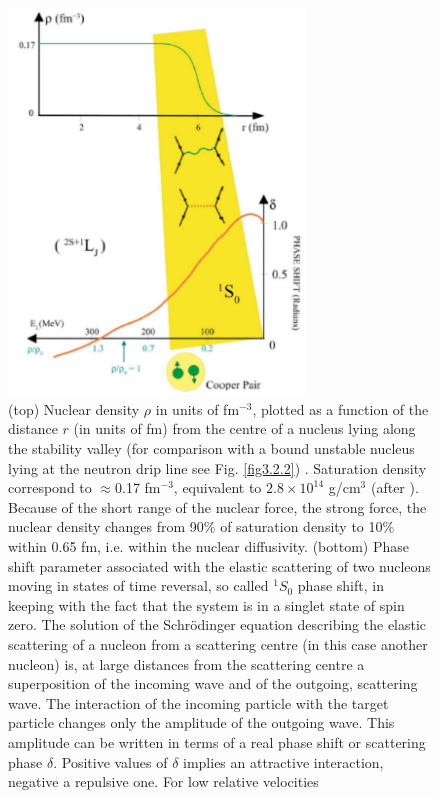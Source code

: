   \begin{figure}[h!]
  \centerline{\includegraphics*[width=0.7\textwidth,angle=0]{nutshell/figs/fig1F1.pdf}}\caption{(top) Nuclear density $\rho$ in units of fm$^{-3}$, plotted as a function of the distance $r$ (in units of fm) from
    the centre of a nucleus lying along the stability valley (for comparison with a bound unstable nucleus lying at the neutron drip line see Fig. \ref{fig3.2.2}) . Saturation density correspond to $\approx$0.17 fm$^{-3}$, equivalent to $2.8\times 10^{14}$ g/cm$^3$ (after \cite{Bohr:69}). Because of the short range of
    the nuclear force, the strong force, the nuclear density changes from 90\% of saturation density to 10\% within 0.65 fm, i.e. within the
    nuclear diffusivity. (bottom) Phase shift  parameter associated with the elastic scattering of two nucleons moving in states of time reversal, so
    called $^1S_0$ phase shift, in keeping with the fact that the system is in a singlet state of spin zero. The solution of the Schr\"odinger equation
    describing the elastic scattering of a nucleon from a scattering centre (in this case another nucleon) is, at large distances from the
    scattering centre a superposition of the incoming wave and of the outgoing, scattering wave. The interaction of the incoming particle
    with the target particle changes only the amplitude of the outgoing wave. This amplitude can be written in terms of a real phase
    shift  or scattering phase $\delta$. Positive values of $\delta$ implies an attractive interaction, negative a repulsive one. For low relative velocities
}
\end{figure}
